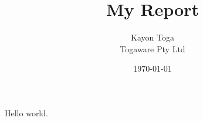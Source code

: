 \documentclass[a4paper,12pt]{article}
\title{My Report}
\author{Kayon Toga\\Togaware Pty Ltd}
\date{\today}
\begin{document}
Hello world.
\end{document}
